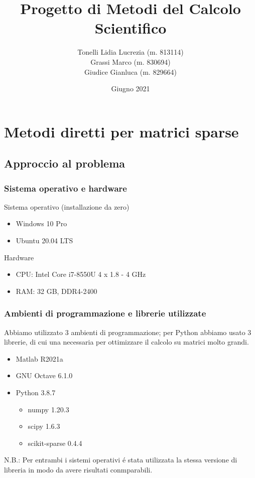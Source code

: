 \documentclass{beamer}
\title{Progetto di Metodi del Calcolo Scientifico} %
\author{Tonelli Lidia Lucrezia (m. 813114)\\
Grassi Marco (m. 830694)\\
Giudice Gianluca (m. 829664)
} %
\institute[University of Milano Bicocca] %
{
University of Milano Bicocca \\ %
\medskip
}
\date{Giugno 2021} %
\begin{document}
\begin{frame}
\titlepage %
\end{frame}


\section{Metodi diretti per matrici sparse}

\subsection{Approccio al problema}

\begin{frame}
	
	\frametitle{Sistema operativo e hardware }
	Sistema operativo (installazione da zero)
	\begin{itemize}
		\item Windows 10 Pro
		\item Ubuntu 20.04 LTS
	\end{itemize}

	Hardware
	\begin{itemize}
		\item CPU: Intel Core i7-8550U 4 x 1.8 - 4 GHz
		\item RAM: 32 GB, DDR4-2400
	\end{itemize}
\end{frame}


\begin{frame}
	
	\frametitle{Ambienti di programmazione e librerie utilizzate}
	Abbiamo utilizzato 3 ambienti di programmazione; per Python abbiamo usato 3 librerie, di cui una necessaria per ottimizzare il calcolo su matrici molto grandi.
	\begin{itemize}
		\item Matlab  R2021a
		\item GNU Octave 6.1.0
		\item Python 3.8.7
		\begin{itemize}
			\item numpy 1.20.3
			\item scipy 1.6.3
			\item scikit-sparse 0.4.4
		\end{itemize}
	\end{itemize}
	N.B.: Per entrambi i sistemi operativi \'e stata utilizzata la stessa versione di libreria in modo da avere risultati conmparabili.
\end{frame}
\end{document}
